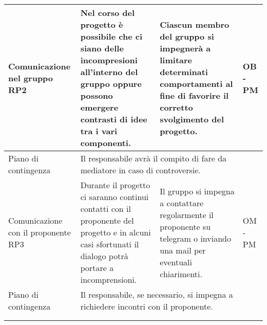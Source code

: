 \begin{center}
\begin{longtable}{|p{}|p{}|p{}|p{}|}
		\hline
		\centering Comunicazione nel gruppo RP2& Nel corso del progetto è possibile che ci siano delle incompresioni all'interno del gruppo oppure possono emergere contrasti di idee tra i vari componenti. &Ciascun membro del gruppo si impegnerà a limitare determinati comportamenti al fine di favorire il corretto svolgimento del progetto. & OB - PM \\
		\hline
		\centering Piano di contingenza & \multicolumn{3}{p{0.84\textwidth}}{Il responsabile avrà il compito di fare da mediatore in caso di controversie.} \\
		\hline
		\centering Comunicazione con il proponente RP3& Durante il progetto ci saranno continui contatti con il proponente del progetto e in alcuni casi sfortunati il dialogo potrà portare a incomprensioni.& Il gruppo si impegna a contattare regolarmente il proponente su telegram o inviando una mail per eventuali chiarimenti. & OM - PM \\
		\hline
		\centering Piano di contingenza & \multicolumn{3}{p{0.84\textwidth}}{Il responsabile, se necessario, si impegna a richiedere incontri con il proponente.} \\
		\hline
		\caption*{\textbf{Tabella 1}: Analisi dei rischi\\}			
	\end{longtable}
\end{center}
